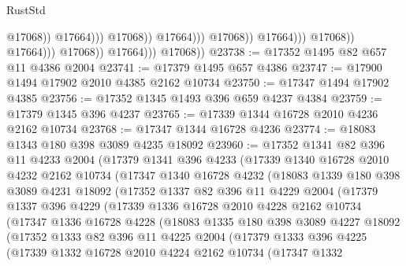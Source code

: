 \begin{lexlean}{RustStd}
\begin{coremodule}
                                                          @17068))
                                                      @17664)))
                                                @17068))
                                            @17664)))
                                      @17068))
                                  @17664)))
                            @17068))
                        @17664)))
                  @17068))
              @17664)))
        @17068))
@23738 := @17352 @1495 @82 @657 @11 @4386 @2004
@23741 := @17379 @1495 @657 @4386
@23747 := @17900 @1494 @17902 @2010 @4385 @2162 @10734
@23750 := @17347 @1494 @17902 @4385
@23756 := @17352 @1345 @1493 @396 @659 @4237 @4384
@23759 := @17379 @1345 @396 @4237
@23765 := @17339 @1344 @16728 @2010 @4236 @2162 @10734
@23768 := @17347 @1344 @16728 @4236
@23774 := @18083 @1343 @180 @398 @3089 @4235 @18092
@23960 := @17352
    @1341
    @82
    @396
    @11
    @4233
    @2004
    (@17379
      @1341
      @396
      @4233
      (@17339
        @1340
        @16728
        @2010
        @4232
        @2162
        @10734
        (@17347
          @1340
          @16728
          @4232
          (@18083
            @1339
            @180
            @398
            @3089
            @4231
            @18092
            (@17352
              @1337
              @82
              @396
              @11
              @4229
              @2004
              (@17379
                @1337
                @396
                @4229
                (@17339
                  @1336
                  @16728
                  @2010
                  @4228
                  @2162
                  @10734
                  (@17347
                    @1336
                    @16728
                    @4228
                    (@18083
                      @1335
                      @180
                      @398
                      @3089
                      @4227
                      @18092
                      (@17352
                        @1333
                        @82
                        @396
                        @11
                        @4225
                        @2004
                        (@17379
                          @1333
                          @396
                          @4225
                          (@17339
                            @1332
                            @16728
                            @2010
                            @4224
                            @2162
                            @10734
                            (@17347
                              @1332

\end{coremodule}
\end{lexlean}
